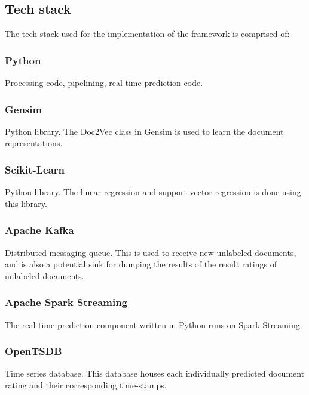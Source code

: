 \documentclass[conference]{IEEEtran}
\begin{document}
    \subsection{Tech stack} \label{Tech stack}
        The tech stack used for the implementation of the framework is comprised of:

        \subsubsection{Python}
            Processing code, pipelining, real-time prediction code\cite{python}.

        \subsubsection{Gensim} \label{gensim}
            Python library. The Doc2Vec class in Gensim is used to learn the document representations\cite{doc2vec_api}.
        
        \subsubsection{Scikit-Learn}
            Python library. The linear regression and support vector regression is done using this library\cite{scikit_learn}.
        
        \subsubsection{Apache Kafka} \label{kafka}
            Distributed messaging queue. This is used to receive new unlabeled documents, and is also a potential sink for dumping the results of the result ratings of unlabeled documents\cite{kreps2011kafka}.
        
        \subsubsection{Apache Spark Streaming} \label{spark}
            The real-time prediction component written in Python runs on Spark Streaming\cite{zaharia2012discretized}.
        
        \subsubsection{OpenTSDB} \label{opentsdb}
            Time series database. This database houses each individually predicted document rating and their corresponding time-stamps\cite{opentsdb}.
        
\end{document}

